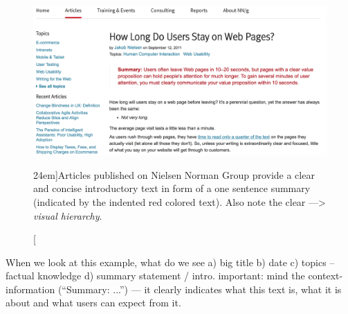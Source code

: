 \begin{figure}%
  \includegraphics[width=1.50\textwidth]{../figures/good_intro_nngroup.png}
  \caption[][24em]{Articles published on Nielsen Norman Group provide a clear and concise introductory text in form of a one sentence summary (indicated by the indented red colored text). Also note the clear ---> \emph{visual hierarchy}.}
  \label{fig:content_usability_nng}
\end{figure}

When we look at this example, what do we see
a) big title
b) date
c) topics -- factual knowledge
d) summary statement / intro. important: mind the context-information (``Summary: ...'') --- it clearly indicates what this text is, what it is about and what users can expect from it.

